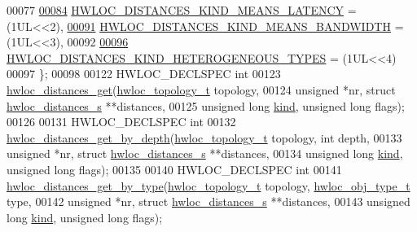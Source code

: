 \begin{DoxyCode}
00077 
\hyperlink{a00208_ggab1bb10d3adb85b52cdc6fe5a7f74f108afd6a3503fbc8f7c1a31235373cefc4c6}{00084}   \hyperlink{a00208_ggab1bb10d3adb85b52cdc6fe5a7f74f108afd6a3503fbc8f7c1a31235373cefc4c6}{HWLOC\_DISTANCES\_KIND\_MEANS\_LATENCY} = (1UL<<2),
\hyperlink{a00208_ggab1bb10d3adb85b52cdc6fe5a7f74f108a41b19f141a3c0ffe85f9affaca4b0293}{00091}   \hyperlink{a00208_ggab1bb10d3adb85b52cdc6fe5a7f74f108a41b19f141a3c0ffe85f9affaca4b0293}{HWLOC\_DISTANCES\_KIND\_MEANS\_BANDWIDTH} = (1UL<<3),
00092 
\hyperlink{a00208_ggab1bb10d3adb85b52cdc6fe5a7f74f108aa6cf2b6dfcf148b65952f811814efbe1}{00096}   \hyperlink{a00208_ggab1bb10d3adb85b52cdc6fe5a7f74f108aa6cf2b6dfcf148b65952f811814efbe1}{HWLOC\_DISTANCES\_KIND\_HETEROGENEOUS\_TYPES} = (1UL<<4)
00097 \};
00098 
00122 HWLOC\_DECLSPEC \textcolor{keywordtype}{int}
00123 \hyperlink{a00208_ga613e6b2a5d0f06626ee8d0c12fa46691}{hwloc\_distances\_get}(\hyperlink{a00186_ga9d1e76ee15a7dee158b786c30b6a6e38}{hwloc\_topology\_t} topology,
00124                     \textcolor{keywordtype}{unsigned} *nr, \textcolor{keyword}{struct} \hyperlink{a00310}{hwloc\_distances\_s} **distances,
00125                     \textcolor{keywordtype}{unsigned} \textcolor{keywordtype}{long} \hyperlink{a00310_aef9c83cf467da1b1fa4c36493febb3b5}{kind}, \textcolor{keywordtype}{unsigned} \textcolor{keywordtype}{long} flags);
00126 
00131 HWLOC\_DECLSPEC \textcolor{keywordtype}{int}
00132 \hyperlink{a00208_ga5d1d35eccfcc2ebcef71a10972ce9b03}{hwloc\_distances\_get\_by\_depth}(\hyperlink{a00186_ga9d1e76ee15a7dee158b786c30b6a6e38}{hwloc\_topology\_t} topology, \textcolor{keywordtype}{int} 
      depth,
00133                              \textcolor{keywordtype}{unsigned} *nr, \textcolor{keyword}{struct} \hyperlink{a00310}{hwloc\_distances\_s} **distances,
00134                              \textcolor{keywordtype}{unsigned} \textcolor{keywordtype}{long} \hyperlink{a00310_aef9c83cf467da1b1fa4c36493febb3b5}{kind}, \textcolor{keywordtype}{unsigned} \textcolor{keywordtype}{long} flags);
00135 
00140 HWLOC\_DECLSPEC \textcolor{keywordtype}{int}
00141 \hyperlink{a00208_gaaa6bfbc20072a4f4de132eec859067f6}{hwloc\_distances\_get\_by\_type}(\hyperlink{a00186_ga9d1e76ee15a7dee158b786c30b6a6e38}{hwloc\_topology\_t} topology, 
      \hyperlink{a00184_gacd37bb612667dc437d66bfb175a8dc55}{hwloc\_obj\_type\_t} type,
00142                             \textcolor{keywordtype}{unsigned} *nr, \textcolor{keyword}{struct} \hyperlink{a00310}{hwloc\_distances\_s} **distances,
00143                             \textcolor{keywordtype}{unsigned} \textcolor{keywordtype}{long} \hyperlink{a00310_aef9c83cf467da1b1fa4c36493febb3b5}{kind}, \textcolor{keywordtype}{unsigned} \textcolor{keywordtype}{long} flags);

\end{DoxyCode}
